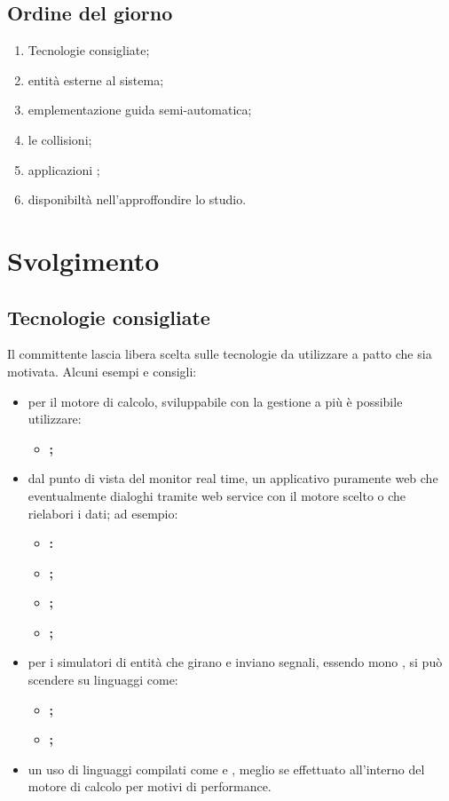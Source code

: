 \documentclass[]{article}
\begin{document}
		\subsection{Ordine del giorno}
		\begin{enumerate}
			\item Tecnologie consigliate;
			\item entità esterne al sistema;
			\item emplementazione guida semi-automatica;
			\item le collisioni;
			\item applicazioni ;
			\item disponibiltà nell'approffondire lo studio.
		\end{enumerate}

	\newpage

	\section{Svolgimento}
		\subsection{Tecnologie consigliate}
	Il committente lascia libera scelta sulle tecnologie da utilizzare a patto che sia motivata. Alcuni esempi e consigli:
	\begin{itemize}
		\item per il motore di calcolo, sviluppabile con la gestione a più  è possibile utilizzare:
		\begin{itemize}
			\item \bfseries{};
		\end{itemize}
		\item dal punto di vista del  monitor real time, un applicativo puramente web che eventualmente dialoghi tramite web service con il motore scelto o che rielabori i dati; ad esempio:
		\begin{itemize}
			\item \bfseries{}:
			\item \bfseries{};
			\item \bfseries{};
			\item \bfseries{};
		\end{itemize}
		\item 	per i simulatori di entità che girano e inviano segnali, essendo mono , si può scendere su linguaggi come:
		\begin{itemize}
			\item \bfseries{};
			\item \bfseries{};
		\end{itemize}
		\item 	un uso di linguaggi compilati come  e , meglio se effettuato all'interno del motore di calcolo per motivi di performance.
	\end{itemize}
\end{document}
